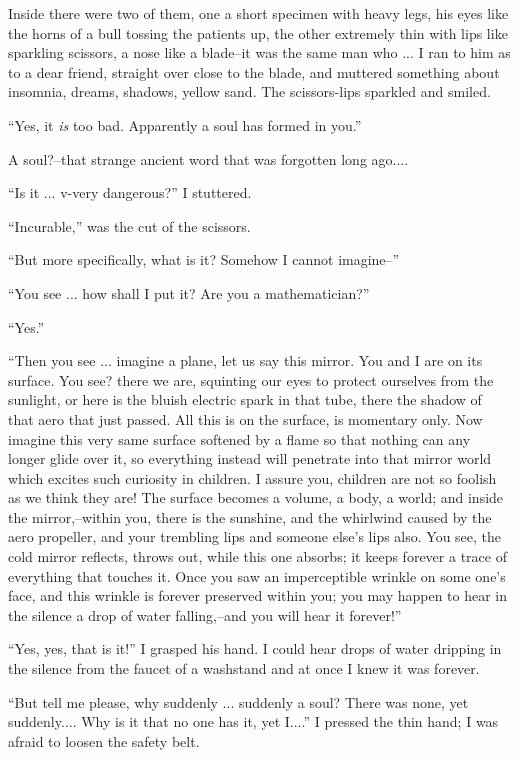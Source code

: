 \documentclass[11pt,openany]{book}
\begin{document}
Inside there were two of them, one a short specimen with heavy legs, his eyes like the horns of a bull tossing the patients up, the other extremely thin with lips like sparkling scissors, a nose like a blade--it was the same man who ... I ran to him as to a dear friend, straight over close to the blade, and muttered something about insomnia, dreams, shadows, yellow sand. The scissors-lips sparkled and smiled.

``Yes, it \emph{is} too bad. Apparently a soul has formed in you.''

A soul?--that strange ancient word that was forgotten long ago....

``Is it ... v-very dangerous?'' I stuttered.

``Incurable,'' was the cut of the scissors.

``But more specifically, what is it? Somehow I cannot imagine--''

``You see ... how shall I put it? Are you a mathematician?''

``Yes.''

``Then you see ... imagine a plane, let us say this mirror. You and I are on its surface. You see? there we are, squinting our eyes to protect ourselves from the sunlight, or here is the bluish electric spark in that tube, there the shadow of that aero that just passed. All this is on the surface, is momentary only. Now imagine this very same surface softened by a flame so that nothing can any longer glide over it, so everything instead will penetrate into that mirror world which excites such curiosity in children. I assure you, children are not so foolish as we think they are! The surface becomes a volume, a body, a world; and inside the mirror,--within you, there is the sunshine, and the whirlwind caused by the aero propeller, and your trembling lips and someone else's lips also. You see, the cold mirror reflects, throws out, while this one absorbs; it keeps forever a trace of everything that touches it. Once you saw an imperceptible wrinkle on some one's face, and this wrinkle is forever preserved within you; you may happen to hear in the silence a drop of water falling,--and you will hear it forever!''

``Yes, yes, that is it!'' I grasped his hand. I could hear drops of water dripping in the silence from the faucet of a washstand and at once I knew it was forever.

``But tell me please, why suddenly ... suddenly a soul? There was none, yet suddenly.... Why is it that no one has it, yet I....'' I pressed the thin hand; I was afraid to loosen the safety belt.
\end{document}
